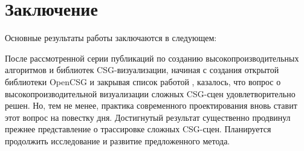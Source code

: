 \chapter*{Заключение}						%

Основные результаты работы заключаются в следующем:



После рассмотренной серии публикаций по созданию высокопроизводительных алгоритмов и библиотек CSG-визуализации, начиная с создания открытой библиотеки OpenCSG \cite{kirsch2005opencsg} и закрывая список работой \cite{lefebvre2013icesl}, казалось, что вопрос о высокопроизводительной визуализации сложных CSG-сцен удовлетворительно решен. Но, тем не менее, практика современного проектирования вновь ставит этот вопрос на повестку дня. Достигнутый результат существенно продвинул прежнее представление о трассировке сложных CSG-сцен. Планируется продолжить исследование и развитие предложенного метода.
